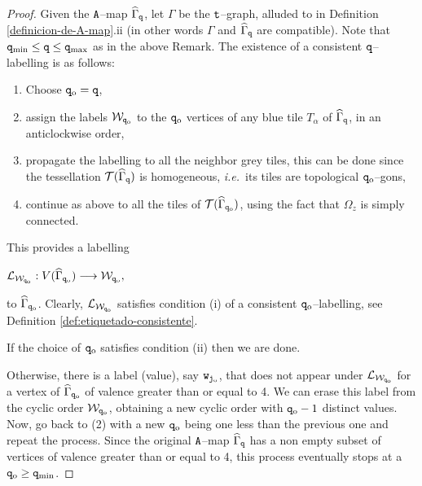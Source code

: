 \documentclass[final,3p,times]{elsarticle}
\theoremstyle{definition}
\begin{document}
\begin{proof}
Given the $\tt A$--map $\widehat{\Gamma}_{\tt q}$, 
let $\Gamma$ be the $\tt t$--graph, alluded to in Definition \ref{definicion-de-A-map}.ii
(in other words $\Gamma$ and $\widehat{\Gamma}_{\tt q}$ are compatible).
Note that ${\tt q}_{\text{min}} \leq {\tt q} \leq {\tt q}_{\text{max}}$ as in the above Remark.
The existence of a consistent ${\tt q}$--labelling is as follows:
\begin{enumerate}[label=\arabic*),leftmargin=*]
\item Choose ${\tt q}_{\rm o} = {\tt q}$,

\item 
assign the labels $\mathcal{W}_{{\tt q}_{\rm o}}$ to the ${\tt q}_{\rm o}$ vertices of any 
blue tile $T_\alpha$ of $\widehat{\Gamma}_{\tt q}$, in an anticlockwise order,

\item
propagate the labelling to all the neighbor grey tiles, 
this can be done since
the tessellation $\mathcal{T}(\widehat{\Gamma}_{\tt q})$ is homogeneous, \emph{i.e.}\, 
its tiles are topological ${\tt q}_{\rm o}$--gons,

\item
continue as above to all the tiles of $\mathcal{T}(\widehat{\Gamma}_{{\tt q}_{\rm o}})$,
using the fact that $\Omega_z$ is simply connected.
\end{enumerate}
This provides a labelling 

\centerline{$
\mathcal{L}_{\mathcal{W}_{{\tt q}_{\rm o}}}: V(\widehat{\Gamma}_{{\tt q}_{\rm o}}) \longrightarrow \mathcal{W}_{{\tt q}_{\rm o}}, 
$}

\noindent
to $\widehat{\Gamma}_{{\tt q}_{\rm o}}$.
Clearly, $\mathcal{L}_{\mathcal{W}_{{\tt q}_{\rm o}}}$ satisfies condition (i) of a consistent ${\tt q}_{\rm o}$--labelling,
see Definition \ref{def:etiquetado-consistente}. 

\noindent
If the choice of ${\tt q}_{\rm o}$ satisfies condition (ii) then we are done.

\noindent
Otherwise, there is a label (value), say ${\tt w}_{{\tt j}_{\rm o}}$, that does not appear under 
$\mathcal{L}_{\mathcal{W}_{{\tt q}_{\rm o}}}$ for a vertex of $\widehat{\Gamma}_{{\tt q}_{\rm o}}$
of valence greater than or equal to 4. 
We can erase this label from the cyclic order $\mathcal{W}_{{\tt q}_{\rm o}}$, 
obtaining a new cyclic order with ${\tt q}_{\rm o} - 1$ distinct values.
Now, go back to (2) with a new ${\tt q}_{\rm o}$ being one less than the previous one and repeat the process.
Since the original $\tt A$--map $\widehat{\Gamma}_{\tt q}$ has a non empty subset of vertices of valence greater than or equal to 4, this process eventually stops at a ${\tt q}_{\rm o} \geq {\tt q}_{\text{min}}$.
\end{proof}
\end{document}
